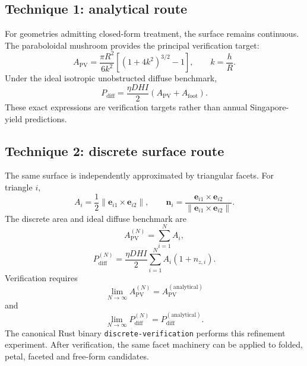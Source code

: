 \documentclass[11pt,a4paper]{article}
\begin{document}
\subsection{Technique 1: analytical route}
For geometries admitting closed-form treatment, the surface remains continuous. The paraboloidal mushroom provides the principal verification target:
\begin{equation}
A_{\mathrm{PV}}
=\frac{\pi R^2}{6k^2}
\left[(1+4k^2)^{3/2}-1\right],
\qquad k=\frac{h}{R}.
\end{equation}
Under the ideal isotropic unobstructed diffuse benchmark,
\begin{equation}
P_{\mathrm{diff}}
=\frac{\eta DHI}{2}
\left(A_{\mathrm{PV}}+A_{\mathrm{foot}}\right).
\end{equation}
These exact expressions are verification targets rather than annual Singapore-yield predictions.

\subsection{Technique 2: discrete surface route}
The same surface is independently approximated by triangular facets. For triangle $i$,
\begin{equation}
A_i=\frac12\|\mathbf e_{i1}\times\mathbf e_{i2}\|,
\qquad
\mathbf n_i=
\frac{\mathbf e_{i1}\times\mathbf e_{i2}}
{\|\mathbf e_{i1}\times\mathbf e_{i2}\|}.
\end{equation}
The discrete area and ideal diffuse benchmark are
\begin{equation}
A_{\mathrm{PV}}^{(N)}=\sum_{i=1}^{N}A_i,
\end{equation}
\begin{equation}
P_{\mathrm{diff}}^{(N)}
=
\frac{\eta DHI}{2}
\sum_{i=1}^{N}A_i(1+n_{z,i}).
\end{equation}
Verification requires
\begin{equation}
\boxed{
\lim_{N\rightarrow\infty}A_{\mathrm{PV}}^{(N)}
=A_{\mathrm{PV}}^{(\mathrm{analytical})}
}
\end{equation}
and
\begin{equation}
\boxed{
\lim_{N\rightarrow\infty}P_{\mathrm{diff}}^{(N)}
=P_{\mathrm{diff}}^{(\mathrm{analytical})}.
}
\end{equation}
The canonical Rust binary \texttt{discrete-verification} performs this refinement experiment. After verification, the same facet machinery can be applied to folded, petal, faceted and free-form candidates.
\end{document}
